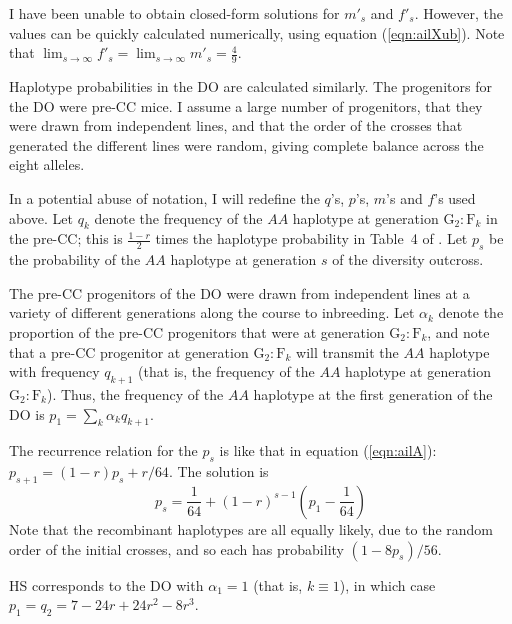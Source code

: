 \documentclass[12pt,letterpaper,pdftex]{article}
\begin{document}
I have been unable to obtain closed-form solutions for $m'_s$ and
$f'_s$.  However, the values can be quickly calculated numerically,
using equation (\ref{eqn:ailXub}).  Note that $\lim_{s \rightarrow \infty}
f'_s = \lim_{s \rightarrow \infty} m'_s = \frac{4}{9}$.

Haplotype probabilities in the DO are
calculated similarly.  The progenitors for the DO were pre-CC mice.
I assume a large number of progenitors, that they
were drawn from independent lines, and that the order of the crosses
that generated the different lines were random, giving complete
balance across the eight alleles.  

In a potential abuse of notation, I will redefine the $q$'s, $p$'s,
$m$'s and $f$'s used above.  Let $q_k$ denote the frequency of the
$AA$ haplotype at generation $\text{G}_2:\text{F}_k$ in the pre-CC;
this is $\frac{1-r}{2}$ times the haplotype probability in Table~4 of
\citet{Broman2012}.  Let $p_s$ be the probability of the $AA$
haplotype at generation $s$ of the diversity outcross.

The pre-CC progenitors of the DO were drawn from independent lines at
a variety of different generations along the course to inbreeding.
Let $\alpha_k$ denote the proportion of the pre-CC progenitors that
were at generation $\text{G}_2:\text{F}_k$, and note that a pre-CC
progenitor at generation $\text{G}_2:\text{F}_k$ will transmit the
$AA$ haplotype with frequency $q_{k+1}$ (that is, the frequency of the
$AA$ haplotype at generation $\text{G}_2:\text{F}_k$).  Thus, the
frequency of the $AA$ haplotype at the first generation of the DO is
$p_1 = \sum_k \alpha_k q_{k+1}$.

The recurrence relation for the $p_s$ is like that in equation
(\ref{eqn:ailA}): $p_{s+1} = (1-r)p_s + r/64$.  The solution is
\begin{equation}
p_s = \textstyle{ \frac{1}{64} + (1-r)^{s-1}\left(p_1 - \frac{1}{64}\right) }
\end{equation}
Note that the recombinant haplotypes are all equally likely, due to the
random order of the initial crosses, and so each has probability
$(1-8p_s)/56$.  

HS corresponds to the DO with $\alpha_1 = 1$ (that is, $k \equiv 1$), in which case $p_1 = q_2
= 7 - 24r + 24r^2 - 8r^3$.
\end{document}
